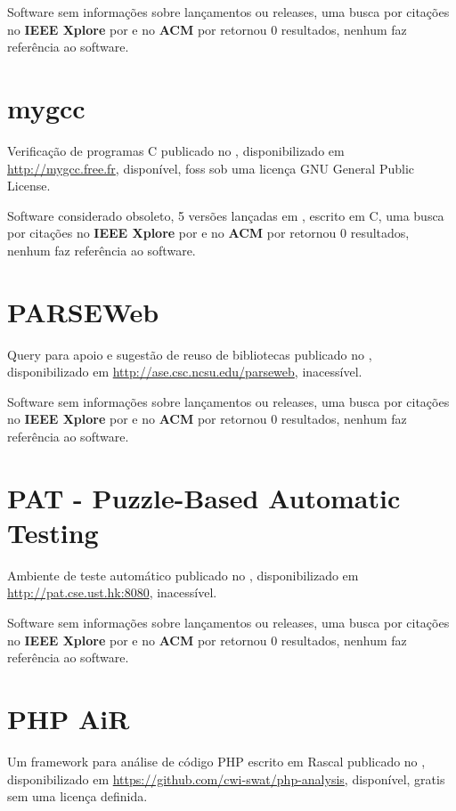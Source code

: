 Software sem informações sobre lançamentos ou releases,
uma busca por citações no {\bf IEEE Xplore} por
\texttt{}
e no {\bf ACM} por
\texttt{}
retornou
0 resultados,
nenhum faz referência ao software.



\section{mygcc}

Verificação de programas C
publicado no  ,
disponibilizado em \url{http://mygcc.free.fr},
disponível,
foss
sob uma licença GNU General Public License.

Software considerado obsoleto,
5 versões lançadas
em ,
escrito em C,
uma busca por citações no {\bf IEEE Xplore} por
\texttt{}
e no {\bf ACM} por
\texttt{}
retornou
0 resultados,
nenhum faz referência ao software.



\section{PARSEWeb}

Query para apoio e sugestão de reuso de bibliotecas
publicado no  ,
disponibilizado em \url{http://ase.csc.ncsu.edu/parseweb},
inacessível.

Software sem informações sobre lançamentos ou releases,
uma busca por citações no {\bf IEEE Xplore} por
\texttt{}
e no {\bf ACM} por
\texttt{}
retornou
0 resultados,
nenhum faz referência ao software.



\section{PAT - Puzzle-Based Automatic Testing}

Ambiente de teste automático
publicado no  ,
disponibilizado em \url{http://pat.cse.ust.hk:8080},
inacessível.

Software sem informações sobre lançamentos ou releases,
uma busca por citações no {\bf IEEE Xplore} por
\texttt{}
e no {\bf ACM} por
\texttt{}
retornou
0 resultados,
nenhum faz referência ao software.



\section{PHP AiR}

Um framework para análise de código PHP escrito em Rascal
publicado no  ,
disponibilizado em \url{https://github.com/cwi-swat/php-analysis},
disponível,
gratis
sem uma licença definida.

